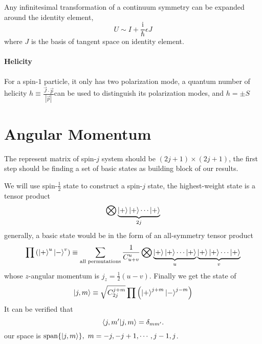 
Any infinitesimal transformation of a continuum symmetry can be expanded around the identity element,
\begin{equation}
  U \sim I + \frac{\mathrm{i}}{\hbar} \epsilon J 
\end{equation}
where $J$ is the basis of tangent space on identity element.

\subsubsection[螺旋度]{Helicity}
For a spin-$1$ particle, it only has two polarization mode, a quantum number of helicity $h \equiv \frac{\vec{J}\cdot \vec{p}}{|\vec{p}|}$can be used to distinguish its polarization modes, and $h = \pm S$

\chapter[角动量]{Angular Momentum}

The represent matrix of spin-$j$ system should be $\left( 2j+1 \right) \times \left( 2j+1 \right)$, the first step should be finding a set of basic states as building block of our results.

We will use spin-$\frac{1}{2}$ state to construct a spin-$j$ state, the highest-weight state is a tensor product
\begin{equation}
   \bigotimes \underbrace{\ket{+} \ket{+} \cdots \ket{+}}_{\text{$2j$}} 
\end{equation}
generally, a basic state would be in the form of an all-symmetry tensor product
\begin{equation}
   \prod \left( \ket{+}^{u} \ket{-}^{v} \right) \equiv \sum_{\text{all permutations}} \frac{1}{C_{u+v}^{u}}\bigotimes \underbrace{\ket{+} \ket{+} \cdots \ket{+}}_{u} \underbrace{\ket{+} \ket{+} \cdots \ket{+}}_{v}
\end{equation}
whose $z$-angular momentum is $j_{z} = \frac{1}{2} \left( u-v \right)$.
Finally we get the state of
\begin{equation}
  \ket{j, m} \equiv \sqrt{C_{2j}^{j+m}} \prod \left( \ket{+} ^{j+m} \ket{-}^{j-m} \right)
\end{equation}
It can be verified that
\begin{equation}
  \bra{j,m'} \ket{j,m} = \delta_{m m'}.
\end{equation}
our space is $\operatorname{span}\{ \ket{j,m} \}, \ m = -j, -j+1, \cdots , j-1, j$.

